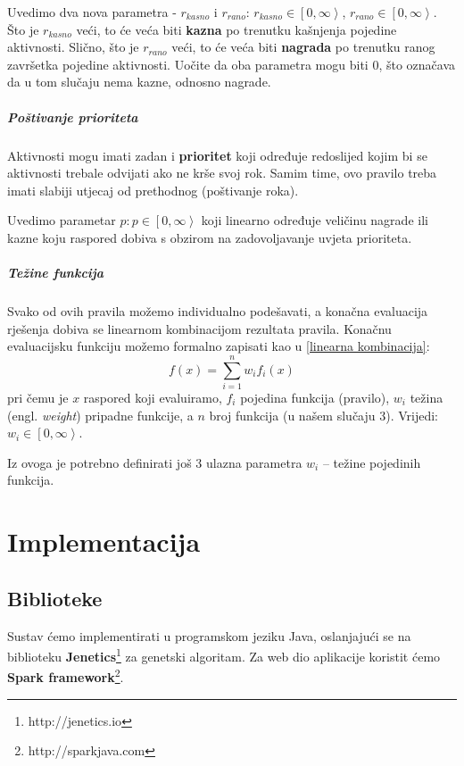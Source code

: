 \documentclass[times, utf8, zavrsni]{fer}
\begin{document}
Uvedimo dva nova parametra - $r_{kasno}$ i $r_{rano}$: $r_{kasno} \in \left[0,\infty \right>$, $r_{rano} \in \left[0,\infty \right>$. Što je $r_{kasno}$ veći, to će veća biti \textbf{kazna} po trenutku kašnjenja pojedine aktivnosti. Slično, što je $r_{rano}$ veći, to će veća biti \textbf{nagrada} po trenutku ranog završetka pojedine aktivnosti. Uočite da oba parametra mogu biti $0$, što označava da u tom slučaju nema kazne, odnosno nagrade.

\paragraph{Poštivanje prioriteta} Aktivnosti mogu imati zadan i \textbf{prioritet} koji određuje redoslijed kojim bi se aktivnosti trebale odvijati ako ne krše svoj rok. Samim time, ovo pravilo treba imati slabiji utjecaj od prethodnog (poštivanje roka).

Uvedimo parametar $p : p \in \left[0,\infty\right>$ koji linearno određuje veličinu nagrade ili kazne koju raspored dobiva s obzirom na zadovoljavanje uvjeta prioriteta.

\paragraph{Težine funkcija} Svako od ovih pravila možemo individualno podešavati, a konačna evaluacija rješenja dobiva se linearnom kombinacijom rezultata pravila. Konačnu evaluacijsku funkciju možemo formalno zapisati kao u \ref{linearna kombinacija}:
\begin{equation}\label{linearna kombinacija}
f(x) = \sum_{i=1}^{n} w_i f_i(x)
\end{equation}
pri čemu je $x$ raspored koji evaluiramo, $f_i$ pojedina funkcija (pravilo), $w_i$ težina (engl. \textit{weight}) pripadne funkcije, a $n$ broj funkcija (u našem slučaju 3). Vrijedi: $w_i \in \left[0, \infty\right>$.

Iz ovoga je potrebno definirati još 3 ulazna parametra $w_i$ -- težine pojedinih funkcija.

\chapter{Implementacija}\label{implementacija}

\section{Biblioteke}
Sustav ćemo implementirati u programskom jeziku Java, oslanjajući se na biblioteku \textbf{Jenetics}\footnote{http://jenetics.io} za genetski algoritam. Za web dio aplikacije koristit ćemo \textbf{Spark framework}\footnote{http://sparkjava.com}.
\end{document}
